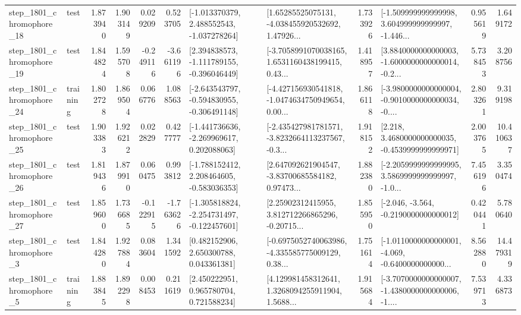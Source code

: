 \begin{tabular}{llrrrrllrlrr}
 step\_1801\_chromophore\_18 &      test &      1.873940 &    1.903149 &      0.029209 &  0.523705 &   [-1.013370379, 2.488552543, -1.037278264] &  [1.65285525075131, -4.038455920532692, 1.47926... &       1.733926 &  [-1.509999999999998, 3.604999999999997, -1.446... &            0.955619 &          1.649172 \\
 step\_1801\_chromophore\_19 &      test &      1.844824 &    1.595708 &     -0.249116 & -3.661196 &   [2.394838573, -1.111789155, -0.396046449] &  [-3.7058991070038165, 1.6531160438199415, 0.43... &       1.418957 &  [3.8840000000000003, -1.6000000000000014, -0.2... &            5.738453 &          3.208756 \\
 step\_1801\_chromophore\_24 &  training &      1.802728 &    1.869504 &      0.066776 &  1.088563 &  [-2.643543797, -0.594830955, -0.306491148] &  [-4.427156930541818, -1.0474634750949654, 0.00... &       1.866118 &  [-3.9800000000000004, -0.9010000000000034, -0.... &            2.803261 &          9.319198 \\
 step\_1801\_chromophore\_25 &      test &      1.903383 &    1.926212 &      0.022829 &  0.427777 &   [-1.441736636, -2.269969617, 0.202088063] &  [-2.435427981781571, -3.8232664113237567, -0.3... &       1.918152 &   [2.218, 3.4680000000000035, -0.4539999999999971] &            2.003765 &         10.410637 \\
 step\_1801\_chromophore\_26 &      test &      1.819436 &    1.879910 &      0.060475 &  0.993812 &   [-1.788152412, 2.208464605, -0.583036353] &  [2.647092621904547, -3.83700685584182, 0.97473... &       1.882380 &  [-2.2059999999999995, 3.5869999999999997, -1.0... &            7.456196 &          3.350474 \\
 step\_1801\_chromophore\_27 &      test &      1.859600 &    1.736685 &     -0.122915 & -1.763626 &  [-1.305818824, -2.254731497, -0.122457601] &  [2.25902312415955, 3.812712266865296, -0.20715... &       1.855950 &              [-2.046, -3.564, -0.2190000000000012] &            0.420441 &          5.780640 \\
  step\_1801\_chromophore\_3 &      test &      1.844280 &    1.927884 &      0.083604 &  1.341592 &     [0.482152906, 2.650300788, 0.043361381] &  [-0.6975052740063986, -4.335585775009129, 0.38... &       1.751614 &  [-1.0110000000000001, -4.069, -0.6400000000000... &            8.562880 &         14.479319 \\
  step\_1801\_chromophore\_5 &  training &      1.883845 &    1.892298 &      0.008453 &  0.211619 &     [2.450222951, 0.965780704, 0.721588234] &  [4.129981458312641, 1.3268094255911904, 1.5688... &       1.915684 &  [-3.7070000000000007, -1.4380000000000006, -1.... &            7.539713 &          4.336873 \\

\end{tabular}
